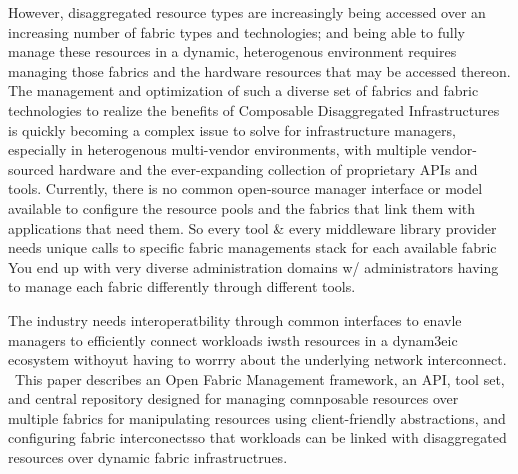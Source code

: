However, disaggregated resource types are increasingly being accessed over an increasing number of fabric types and technologies; and being able to fully manage these resources in a dynamic, heterogenous environment requires managing those fabrics and the hardware resources that may be accessed thereon. The management and optimization of such a diverse set of fabrics and fabric technologies to realize the benefits of Composable Disaggregated Infrastructures is quickly becoming a complex issue to solve for infrastructure managers, especially in heterogenous multi-vendor environments, with multiple vendor-sourced hardware and the ever-expanding collection of proprietary APIs and tools. Currently, there is no common open-source manager interface or model available to configure the resource pools and the fabrics that link them with applications that need them. So every tool & every middleware library provider needs unique calls to specific fabric managements stack for each available fabric You end up with very diverse administration domains w/ administrators having to manage each fabric differently through different tools.

The industry needs interoperatbility through common interfaces to enavle managers to efficiently connect workloads iwsth resources in a dynam3eic ecosystem withoyut having to worrry about the underlying network interconnect.  This paper describes an Open Fabric Management framework, an API, tool set, and central repository designed for managing comnposable resources over multiple fabrics for manipulating resources using client-friendly abstractions, and configuring fabric interconectsso that workloads can be linked with disaggregated resources over dynamic fabric infrastructrues.

  
 

